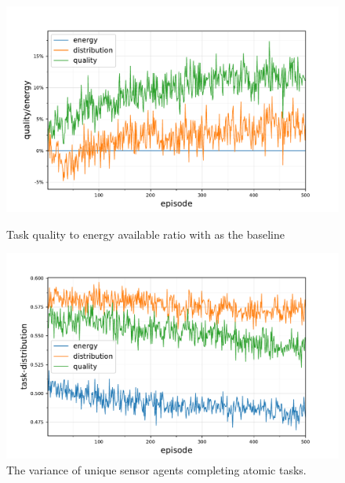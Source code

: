 \begin{figure}[ht]
	\begin{minipage}{.49\textwidth}
		\centering
		\includegraphics[width=1.0\linewidth,trim={25pt 0pt 50pt 0pt},clip]{5.19_ctv-quality-energy-baseline-comparison}
		\caption{Task quality to energy available ratio \newline  with \algorithmEnergy{}{} as the baseline}
		\label{fig:ctv-quality-energy-baseline-comparison}
	\end{minipage}\hfill%
	\begin{minipage}{.49\textwidth}
	\centering
	\includegraphics[width=1.0\linewidth,trim={25pt 0pt 50pt 0pt},clip]{5.19_ctv-task-distribution-comparison}
	\caption{The variance of unique sensor agents completing \newline atomic tasks.}
	\label{fig:ctv-task-distribution-comparison}
\end{minipage}
\end{figure}

